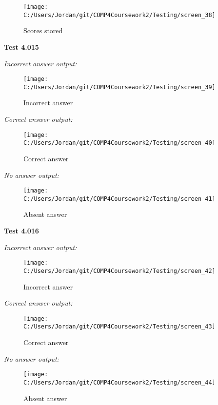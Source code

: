 \begin{figure}[H]
    \label{fig: Second Screen}\caption{Scores stored}
    \texttt{[image: C:/Users/Jordan/git/COMP4Coursework2/Testing/screen\_38]}
\end{figure}

\textbf{Test 4.015}

\textit{Incorrect answer output: }

\begin{figure}[H]
    \label{fig: Second Screen}\caption{Incorrect answer}
    \texttt{[image: C:/Users/Jordan/git/COMP4Coursework2/Testing/screen\_39]}
\end{figure}

\textit{Correct answer output: }

\begin{figure}[H]
    \label{fig: Second Screen}\caption{Correct answer}
    \texttt{[image: C:/Users/Jordan/git/COMP4Coursework2/Testing/screen\_40]}
\end{figure}

\textit{No answer output: }

\begin{figure}[H]
    \label{fig: Second Screen}\caption{Absent answer}
    \texttt{[image: C:/Users/Jordan/git/COMP4Coursework2/Testing/screen\_41]}
\end{figure}

\textbf{Test 4.016}

\textit{Incorrect answer output: }

\begin{figure}[H]
    \label{fig: Second Screen}\caption{Incorrect answer}
    \texttt{[image: C:/Users/Jordan/git/COMP4Coursework2/Testing/screen\_42]}
\end{figure}

\textit{Correct answer output: }

\begin{figure}[H]
    \label{fig: Second Screen}\caption{Correct answer}
    \texttt{[image: C:/Users/Jordan/git/COMP4Coursework2/Testing/screen\_43]}
\end{figure}

\textit{No answer output: }

\begin{figure}[H]
    \label{fig: Second Screen}\caption{Absent answer}
    \texttt{[image: C:/Users/Jordan/git/COMP4Coursework2/Testing/screen\_44]}
\end{figure}

